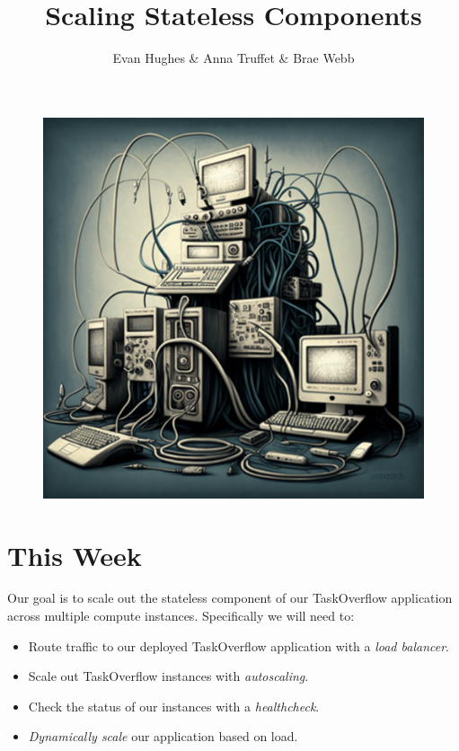 \documentclass{csse4400}
\title{Scaling Stateless Components}
\author{Evan Hughes \& Anna Truffet \& Brae Webb }
\date{\week[practical]{6}}
\begin{document}
\maketitle

\begin{figure}[h]
    \begin{center}
        \includegraphics[scale=0.4]{images/scaling-out}
    \end{center}
\end{figure}

\section{This Week}
Our goal is to scale out the stateless component of our TaskOverflow application across multiple compute instances.
Specifically we will need to:
\begin{itemize}
    \item Route traffic to our deployed TaskOverflow application with a \textsl{load balancer}.
    \item Scale out TaskOverflow instances with \textsl{autoscaling}.
    \item Check the status of our instances with a \textsl{healthcheck}.
    \item \textsl{Dynamically scale} our application based on load.
\end{itemize}
\end{document}
